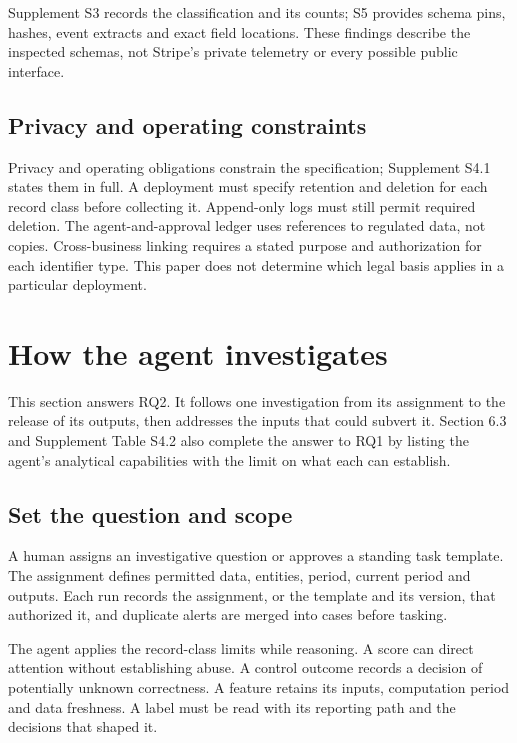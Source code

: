 \documentclass[acmlarge,nonacm]{acmart}
\begin{document}
Supplement S3 records the classification and its counts; S5 provides
schema pins, hashes, event extracts and exact field locations. These
findings describe the inspected schemas, not Stripe's private telemetry
or every possible public interface.

\hypertarget{privacy-and-operating-constraints}{%
\subsection{Privacy and operating
constraints}\label{privacy-and-operating-constraints}}

Privacy and operating obligations constrain the specification;
Supplement S4.1 states them in full. A deployment must specify retention
and deletion for each record class before collecting it. Append-only
logs must still permit required deletion. The agent-and-approval ledger
uses references to regulated data, not copies. Cross-business linking
requires a stated purpose and authorization for each identifier type.
This paper does not determine which legal basis applies in a particular
deployment.

\hypertarget{how-the-agent-investigates}{%
\section{How the agent investigates}\label{how-the-agent-investigates}}

This section answers RQ2. It follows one investigation from its
assignment to the release of its outputs, then addresses the inputs that
could subvert it. Section 6.3 and Supplement Table S4.2 also complete
the answer to RQ1 by listing the agent's analytical capabilities with
the limit on what each can establish.

\hypertarget{set-the-question-and-scope}{%
\subsection{Set the question and
scope}\label{set-the-question-and-scope}}

A human assigns an investigative question or approves a standing task
template. The assignment defines permitted data, entities, period,
current period and outputs. Each run records the assignment, or the
template and its version, that authorized it, and duplicate alerts are
merged into cases before tasking.

The agent applies the record-class limits while reasoning. A score can
direct attention without establishing abuse. A control outcome records a
decision of potentially unknown correctness. A feature retains its
inputs, computation period and data freshness. A label must be read with
its reporting path and the decisions that shaped it.
\end{document}
